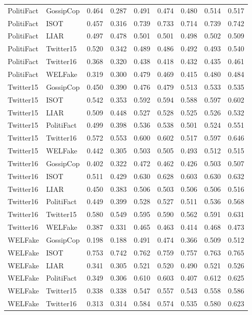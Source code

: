 \begin{longtable}{@{}llrrrrrrr@{}}
PolitiFact & GossipCop & 0.464 & 0.287 & 0.491 & 0.474 & 0.480 & 0.514 & 0.517 \\
PolitiFact & ISOT & 0.457 & 0.316 & 0.739 & 0.733 & 0.714 & 0.739 & 0.742 \\
PolitiFact & LIAR & 0.497 & 0.478 & 0.501 & 0.501 & 0.498 & 0.502 & 0.509 \\
PolitiFact & Twitter15 & 0.520 & 0.342 & 0.489 & 0.486 & 0.492 & 0.493 & 0.540 \\
PolitiFact & Twitter16 & 0.368 & 0.320 & 0.438 & 0.418 & 0.432 & 0.435 & 0.461 \\
PolitiFact & WELFake & 0.319 & 0.300 & 0.479 & 0.469 & 0.415 & 0.480 & 0.484 \\
Twitter15 & GossipCop & 0.450 & 0.390 & 0.476 & 0.479 & 0.513 & 0.533 & 0.535 \\
Twitter15 & ISOT & 0.542 & 0.353 & 0.592 & 0.594 & 0.588 & 0.597 & 0.602 \\
Twitter15 & LIAR & 0.509 & 0.448 & 0.527 & 0.528 & 0.525 & 0.526 & 0.532 \\
Twitter15 & PolitiFact & 0.499 & 0.398 & 0.536 & 0.538 & 0.501 & 0.524 & 0.551 \\
Twitter15 & Twitter16 & 0.572 & 0.553 & 0.600 & 0.602 & 0.517 & 0.597 & 0.646 \\
Twitter15 & WELFake & 0.442 & 0.305 & 0.503 & 0.505 & 0.493 & 0.512 & 0.515 \\
Twitter16 & GossipCop & 0.402 & 0.322 & 0.472 & 0.462 & 0.426 & 0.503 & 0.507 \\
Twitter16 & ISOT & 0.511 & 0.429 & 0.630 & 0.628 & 0.603 & 0.630 & 0.632 \\
Twitter16 & LIAR & 0.450 & 0.383 & 0.506 & 0.503 & 0.506 & 0.506 & 0.516 \\
Twitter16 & PolitiFact & 0.449 & 0.399 & 0.528 & 0.527 & 0.511 & 0.536 & 0.568 \\
Twitter16 & Twitter15 & 0.580 & 0.549 & 0.595 & 0.590 & 0.562 & 0.591 & 0.631 \\
Twitter16 & WELFake & 0.387 & 0.331 & 0.465 & 0.463 & 0.414 & 0.468 & 0.473 \\
WELFake & GossipCop & 0.198 & 0.188 & 0.491 & 0.474 & 0.366 & 0.509 & 0.512 \\
WELFake & ISOT & 0.753 & 0.742 & 0.762 & 0.759 & 0.757 & 0.763 & 0.765 \\
WELFake & LIAR & 0.341 & 0.305 & 0.521 & 0.520 & 0.490 & 0.521 & 0.526 \\
WELFake & PolitiFact & 0.349 & 0.306 & 0.610 & 0.603 & 0.407 & 0.612 & 0.625 \\
WELFake & Twitter15 & 0.338 & 0.338 & 0.547 & 0.557 & 0.543 & 0.558 & 0.586 \\
WELFake & Twitter16 & 0.313 & 0.314 & 0.584 & 0.574 & 0.535 & 0.580 & 0.623 \\
\bottomrule
\end{longtable}
